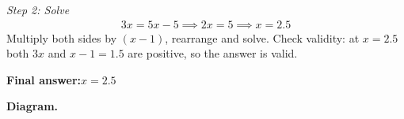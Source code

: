 \documentclass[11pt]{article}
\begin{document}
\textit{Step 2: Solve}
\[\begin{gathered}
3x = 5x - 5 \implies 2x = 5 \implies x = 2.5
\end{gathered}\]
Multiply both sides by \( (x-1) \), rearrange and solve. Check validity: at \( x = 2.5 \) both \( 3x \) and \( x-1 = 1.5 \) are positive, so the answer is valid.

\begin{answerbox}
\textbf{Final answer:}\quad \(\displaystyle x = 2.5\)
\end{answerbox}
\textbf{Diagram.}

\begin{center}
\end{center}
\end{document}
